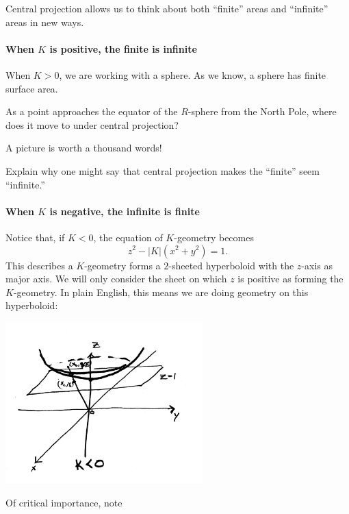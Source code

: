 \documentclass{ximera}
\begin{document}
Central projection allows us to think about both ``finite'' areas and
``infinite'' areas in new ways.

\paragraph{When $K$ is positive, the finite is infinite}

When $K>0$, we are working with a sphere. As we know, a sphere has
finite surface area.

\begin{problem}
  As a point approaches the equator of the $R$-sphere from the North
  Pole, where does it move to under central projection?
  \begin{hint}
    A picture is worth a thousand words!
  \end{hint}
  \begin{freeResponse}
  \end{freeResponse}
\end{problem}

\begin{problem}
  Explain why one might say that central projection makes the
  ``finite'' seem ``infinite.''
    \begin{freeResponse}
    \end{freeResponse}
\end{problem}


\paragraph{When $K$ is negative, the infinite is finite}


Notice that, if $K<0$, the equation of $K$-geometry becomes
\[
z^{2}-|K|\left(x^{2}+y^{2}\right)  =1.
\]
This describes a $K$-geometry forms a $2$-sheeted hyperboloid with the
$z$-axis as major axis. We will only consider the sheet on which $z$
is positive as forming the $K$-geometry. In plain English, this means
we are doing geometry on this hyperboloid:
\begin{image}
\includegraphics[width=3in]{UpperHyperboloid.png}
\end{image}
Of critical importance, note
\end{document}

